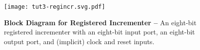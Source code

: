 
\begin{figure}

  \hfill%
  \begin{minipage}[t]{0.35\tw}
    \vspace{0pt}

    \texttt{[image: tut3-regincr.svg.pdf]}
  \end{minipage}
  \hfill%
  \begin{minipage}[t]{0.53\tw}
    \caption{\textbf{Block Diagram for Registered Incrementer --} An
      eight-bit registered incrementer with an eight-bit input port, an
      eight-bit output port, and (implicit) clock and reset inputs.}
    \label{fig-tut3-regincr}
  \end{minipage}
  \hfill\mbox{}

\end{figure}

